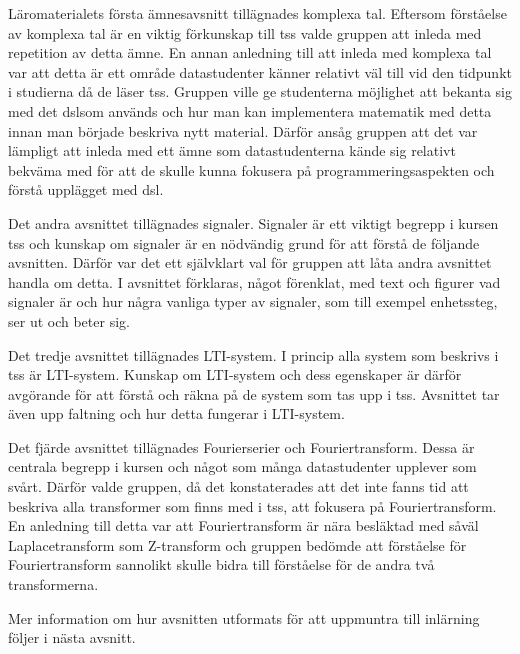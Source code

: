 \documentclass[12pt,a4paper,twoside,openright]{article}
\begin{document}
Läromaterialets första ämnesavsnitt tillägnades komplexa tal. Eftersom
förståelse av komplexa tal är en viktig förkunskap till \gls{tss}
valde gruppen att inleda med repetition av detta ämne. En annan
anledning till att inleda med komplexa tal var att detta är ett område
datastudenter känner relativt väl till vid den tidpunkt i studierna då
de läser \gls{tss}. Gruppen ville ge studenterna möjlighet att bekanta
sig med det \gls{dsl}som används och hur man kan implementera
matematik med detta innan man började beskriva nytt material. Därför
ansåg gruppen att det var lämpligt att inleda med ett ämne som
datastudenterna kände sig relativt bekväma med för att de skulle kunna
fokusera på programmeringsaspekten och förstå upplägget med \gls{dsl}.

Det andra avsnittet tillägnades signaler. Signaler är ett viktigt
begrepp i kursen \gls{tss} och kunskap om signaler är en nödvändig
grund för att förstå de följande avsnitten. Därför var det ett
självklart val för gruppen att låta andra avsnittet handla om detta. I
avsnittet förklaras, något förenklat, med text och figurer vad
signaler är och hur några vanliga typer av signaler, som till exempel
enhetssteg, ser ut och beter sig.

Det tredje avsnittet tillägnades LTI-system. I princip alla system som
beskrivs i \gls{tss} är LTI-system. Kunskap om LTI-system och dess
egenskaper är därför avgörande för att förstå och räkna på de system
som tas upp i \gls{tss}. Avsnittet tar även upp faltning och hur detta
fungerar i LTI-system.

Det fjärde avsnittet tillägnades Fourierserier och
Fouriertransform. Dessa är centrala begrepp i kursen och något som
många datastudenter upplever som svårt. Därför valde gruppen, då det
konstaterades att det inte fanns tid att beskriva alla transformer som
finns med i \gls{tss}, att fokusera på Fouriertransform. En anledning
till detta var att Fouriertransform är nära besläktad med såväl
Laplacetransform som Z-transform och gruppen bedömde att förståelse
för Fouriertransform sannolikt skulle bidra till förståelse för de
andra två transformerna.

Mer information om hur avsnitten utformats för att uppmuntra till
inlärning följer i nästa avsnitt.
\end{document}
